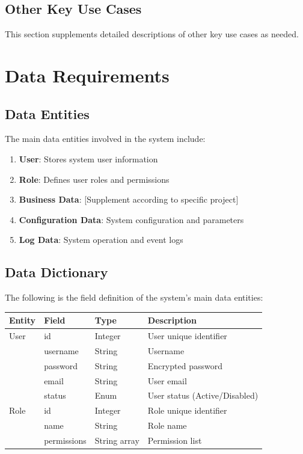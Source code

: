 \documentclass[a4paper,12pt]{article}
\begin{document}
\subsection{Other Key Use Cases}

This section supplements detailed descriptions of other key use cases as needed.

\section{Data Requirements}

\subsection{Data Entities}

The main data entities involved in the system include:

\begin{enumerate}
  \item \textbf{User}: Stores system user information
  \item \textbf{Role}: Defines user roles and permissions
  \item \textbf{Business Data}: [Supplement according to specific project]
  \item \textbf{Configuration Data}: System configuration and parameters
  \item \textbf{Log Data}: System operation and event logs
\end{enumerate}

\subsection{Data Dictionary}

The following is the field definition of the system's main data entities:

\begin{longtable}{|p{3cm}|p{3cm}|p{3cm}|p{6cm}|}
\hline
\textbf{Entity} & \textbf{Field} & \textbf{Type} & \textbf{Description} \\
\hline
\endhead
User & id & Integer & User unique identifier \\
\hline
 & username & String & Username \\
\hline
 & password & String & Encrypted password \\
\hline
 & email & String & User email \\
\hline
 & status & Enum & User status (Active/Disabled) \\
\hline
Role & id & Integer & Role unique identifier \\
\hline
 & name & String & Role name \\
\hline
 & permissions & String array & Permission list \\
\hline
\end{longtable}
\end{document}

